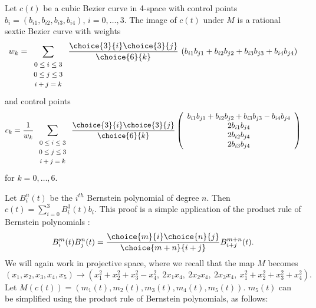 \begin{theorem}
\label{sextic}
Let $c(t)$ be a cubic Bezier curve in 4-space with
control points $b_i = (b_{i1},b_{i2},b_{i3},b_{i4})$, $i=0,\ldots,3$.
The image of $c(t)$ under $M$ is a rational sextic Bezier curve with 
weights 
\begin{equation}
\label{eq:weights}
w_k = \sum_{\begin{array}{c} \mbox{\footnotesize{$0 \leq i \leq 3$}} \\ 
			     \mbox{\footnotesize{$0 \leq j \leq 3$}} \\ 
			     \mbox{\footnotesize{$i+j=k$}}
			     \end{array}}
        \frac{\choice{3}{i} \choice{3}{j}}{\choice{6}{k}}
	\ (b_{i1} b_{j1} + b_{i2} b_{j2} + b_{i3} b_{j3} + b_{i4} b_{j4})
\end{equation}
and control points 
\begin{equation}
\label{eq:control-pts}
c_k = \frac{1}{w_k} 
      \sum_{\begin{array}{c} \mbox{\footnotesize{$0 \leq i \leq 3$}} \\ 
			     \mbox{\footnotesize{$0 \leq j \leq 3$}} \\ 
			     \mbox{\footnotesize{$i+j=k$}}
			     \end{array}} 
        \frac{\choice{3}{i} \choice{3}{j}}{\choice{6}{k}}
	\left( \begin{array}{c}
            b_{i1} b_{j1} + b_{i2} b_{j2} + b_{i3} b_{j3} - b_{i4} b_{j4} \\
            2b_{i1} b_{j4} \\
            2b_{i2} b_{j4} \\
            2b_{i3} b_{j4} 
	\end{array} \right)
\end{equation}
for $k = 0, \ldots, 6$.
\end{theorem}
\prf
Let $B_i^n(t)$ be the $i^{th}$ Bernstein polynomial of degree $n$.
Then $c(t) = \sum_{i=0}^3 B_i^3(t) b_{i}$.
This proof is a simple application of the product rule of Bernstein polynomials
\cite{farin97}:
\[
	B_i^m(t) B_j^n(t) = \frac{\choice{m}{i} \choice{n}{j}}{\choice{m+n}{i+j}}
		B_{i+j}^{m+n}(t).
\]
We will again work in projective space, where we recall that
the map $M$ becomes
\[
	 (x_1,x_2,x_3,x_4,x_5) \rightarrow
	 (x_1^2 + x_2^2 + x_3^2 - x_4^2,\ 
	 2x_1 x_4,\ 2x_2 x_4,\ 2x_3 x_4,\ 
	 x_1^2 + x_2^2 + x_3^2 + x_4^2).
\]
Let $M(c(t)) = (m_1(t),m_2(t),m_3(t),m_4(t),m_5(t))$.
$m_5(t)$ can be simplified using the product rule 
of Bernstein polynomials, as follows:
